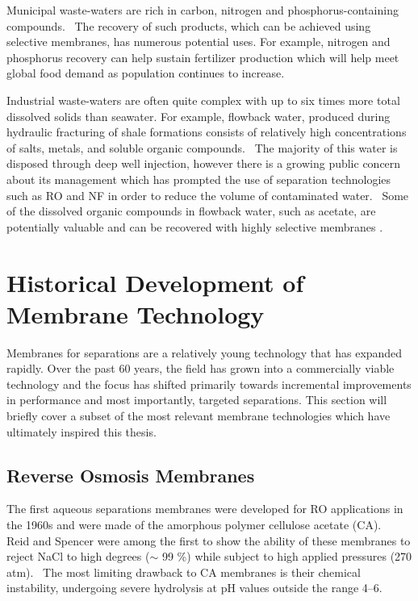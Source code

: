   Municipal waste-waters are rich in carbon, nitrogen and phosphorus-containing 
  compounds.~\cite{romero_raw_2013} The recovery of such products, which can be 
  achieved using selective membranes, has numerous potential uses.\cite{sales_resource_2015}
  For example, nitrogen and phosphorus recovery can help sustain fertilizer 
  production which will help meet global food demand as population continues
  to increase.\cite{xie_membrane-based_2016}

  Industrial waste-waters are often quite complex with up to six times more 
  total dissolved solids than seawater.\cite{werber_materials_2016} For example,
  flowback water, produced during hydraulic fracturing of shale formations consists
  of relatively high concentrations of salts, metals, and soluble organic 
  compounds.~\cite{orem_organic_2014} The majority of this water is disposed 
  through deep well injection, however there is a growing public concern about
  its management which has prompted the use of separation technologies such as 
  RO and NF in order to reduce the volume of contaminated water.~\cite{gregory_water_2011}
  Some of the dissolved organic compounds in flowback water, such as acetate, 
  are potentially valuable and can be recovered with highly selective membranes
  \cite{dischinger_application_2017}.

  \section{Historical Development of Membrane Technology}
  
  Membranes for separations are a relatively young technology that has expanded
  rapidly. Over the past 60 years, the field has grown into a commercially viable
  technology and the focus has shifted primarily towards incremental improvements
  in performance and most importantly, targeted separations. This section will 
  briefly cover a subset of the most relevant membrane technologies which have 
  ultimately inspired this thesis.
  
  \subsection{Reverse Osmosis Membranes}
  
  The first aqueous separations membranes were developed for RO applications 
  in the 1960s and were made of the amorphous polymer cellulose acetate (CA).~\cite{kesting_semipermeable_1965}
  Reid and Spencer were among the first to show the ability of these membranes
  to reject NaCl to high degrees ($\sim$ 99 \%) while subject to high applied 
  pressures (270 atm).~\cite{reid_ultrafiltration_1960} The most limiting 
  drawback to CA membranes is their chemical instability, undergoing severe 
  hydrolysis at pH values outside the range 4--6.~\cite{vos_kinetic_1966}
  

